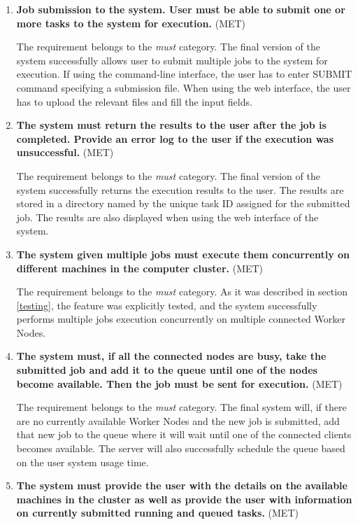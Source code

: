 \documentclass[10pt]{report}
\begin{document}
\begin{enumerate}
    \item \textbf{Job submission to the system. User must be able to submit one or more tasks to the system for execution.} (MET)

    The requirement belongs to the \textit{must} category. The final version of the system successfully allows user to submit multiple jobs to the system for execution. If using the command-line interface, the user has to enter SUBMIT command specifying a submission file. When using the web interface, the user has to upload the relevant files and fill the input fields.

    \item \textbf{The system must return the results to the user after the job is completed. Provide an error log to the user if the execution was unsuccessful.} (MET)

    The requirement belongs to the \textit{must} category. The final version of the system successfully returns the execution results to the user. The results are stored in a directory named by the unique task ID assigned for the submitted job. The results are also displayed when using the web interface of the system.

    \item \textbf{The system given multiple jobs must execute them concurrently on different machines in the computer cluster.} (MET)

    The requirement belongs to the \textit{must} category. As it was described in section \ref{testing}, the feature was explicitly tested, and the system successfully performs multiple jobs execution concurrently on multiple connected Worker Nodes.

    \item \textbf{The system must, if all the connected nodes are busy, take the submitted job and add it to the queue until one of the nodes become available. Then the job must be sent for execution.} (MET)

    The requirement belongs to the \textit{must} category. The final system will, if there are no currently available Worker Nodes and the new job is submitted, add that new job to the queue where it will wait until one of the connected clients becomes available. The server will also successfully schedule the queue based on the user system usage time.

    \item \textbf{The system must provide the user with the details on the available machines in the cluster as well as provide the user with information on currently submitted running and queued tasks.} (MET)


\end{enumerate}
\end{document}
